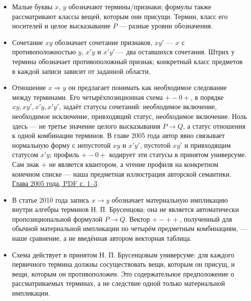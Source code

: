 \documentclass[12pt,a4paper]{article}
\begin{document}
\begin{itemize}
\item Малые буквы \(x\), \(y\) обозначают термины/признаки; формулы также рассматривают классы вещей, которым они присущи. Термин, класс его носителей и целое высказывание \(P\) — разные уровни обозначения.
\item Сочетание \(xy\) обозначает сочетание признаков, \(xy'\) — \(x\) с противоположностью \(y\), \(x'y\) и \(x'y'\) — два оставшихся сочетания. Штрих у термина обозначает противоположный признак; конкретный класс предметов в каждой записи зависит от заданной области.
\item Отношение \(x\Rightarrow y\) он предлагает понимать как необходимое следование между терминами. Его четырёхпозиционная схема \(+-0+\), в порядке \(xy, xy', x'y, x'y'\), задаёт статусы сочетаний: необходимое включение, необходимое исключение, привходящий статус, необходимое включение. Ноль здесь — не третье значение целого высказывания \(P\to Q\), а статус отношения к одной комбинации терминов. В главе 2005 года автор явно связывает нормальную форму с непустотой \(xy\) и \(x'y'\), пустотой \(xy'\) и привходящим статусом \(x'y\); профиль \(+-0+\) кодирует эти статусы в принятом универсуме. Сам знак \(+\) не является квантором, а чтение профиля на конкретном конечном списке — наша предметная иллюстрация авторской семантики. \href{../sources/pdfs/Брусенцов_Реанимация-аристотелевой-силлогистики_2005-глава-из-Реставрации-логики.pdf}{Глава 2005 года, PDF с. 1–3}.
\item В статье 2010 года запись \(x\to y\) обозначает материальную импликацию внутри алгебры терминов Н. П. Брусенцова; она не является автоматически пропозициональной формулой \(P\to Q\). Вектор \(+-++\), полученный для обычной материальной импликации по четырём предметным комбинациям, — наше сравнение, а не введённая автором векторная таблица.
\item Схема действует в принятом Н. П. Брусенцовым универсуме: для каждого первичного термина должны сосуществовать вещи, которым он присущ, и вещи, которым он противоположен. Это содержательное предположение о рассматриваемых терминах, а не следствие одной только материальной импликации.
\end{itemize}
\end{document}
